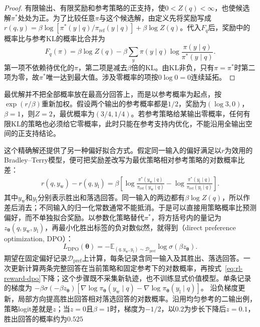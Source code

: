 \begin{proof}
  有限输出、有限奖励和参考策略的正支持，使$0<Z(q)<\infty$，也使候选解$\pi^*$处处为正。为了比较任意$\pi$与这个候选解，由定义先将奖励写成
  $r(q,y)=\beta\log[\pi^*(y\mid q)/\pi_{\mathrm{ref}}(y\mid q)]
  +\beta\log Z(q)$。代入$F_q$后，奖励中的概率比与参考KL的概率比合并为
  \[
    F_q(\pi)=\beta\log Z(q)
       -\beta\sum_y\pi(y\mid q)\log\frac{\pi(y\mid q)}{\pi^*(y\mid q)}.
  \]
  第一项不依赖待优化的$\pi$，第二项是减去$\beta$倍的KL。由KL非负，只有$\pi=\pi^*$时第二项为零，故$\pi^*$唯一达到最大值。涉及零概率的项按$0\log0=0$连续延拓。
\end{proof}

最优解并不把全部概率放在最高分回答上，而是以参考概率为起点，按$\exp(r/\beta)$重新加权。假设两个输出的参考概率都是$1/2$，奖励为$(\log3,0)$，$\beta=1$，则$Z=2$，最优概率为$(3/4,1/4)$。若参考策略给某输出零概率，任何有限KL的策略也必须给它零概率，此时只能在参考支持内优化，不能沿用全输出空间的正支持结论。

这个精确解还提供了另一种偏好拟合方式。假定同一输入的偏好满足以$r$为效用的Bradley--Terry模型，便可把奖励差改写为最优策略相对参考策略的对数概率比差：
\begin{equation}
  \begin{aligned}
    r(q,y_{\mathrm w})-r(q,y_{\mathrm l})
    =\beta\left[
      \log\frac{\pi^*(y_{\mathrm w}\mid q)}
                    {\pi_{\mathrm{ref}}(y_{\mathrm w}\mid q)}
      -\log\frac{\pi^*(y_{\mathrm l}\mid q)}
                    {\pi_{\mathrm{ref}}(y_{\mathrm l}\mid q)}
    \right].
  \end{aligned}
  \label{eq:rl-reward-dpo-change}
\end{equation}
其中$y_{\mathrm w}$和$y_{\mathrm l}$分别表示胜出和落选回答。同一输入的两边都有$\beta\log Z(q)$，所以作差后消去；不同输入的归一化常数通常不能抵消。于是可以直接用策略概率比预测偏好，而不单独拟合奖励。以参数化策略替代$\pi^*$，将方括号内的量记为$z_{\bm{\theta}}(q,y_{\mathrm w},y_{\mathrm l})$，再最小化胜出标签的负对数似然，就得到（direct preference optimization, DPO）：
\begin{equation}
  L_{\mathrm{DPO}}(\bm{\theta})
  =-\mathbb E_{(q,y_{\mathrm w},y_{\mathrm l})\sim\mathcal D_{\mathrm{pref}}}
         \log\sigma\!\left(\beta z_{\bm{\theta}}\right).
  \label{eq:rl-reward-dpo}
\end{equation}
期望在固定偏好记录$\mathcal D_{\mathrm{pref}}$上计算，每条记录含同一输入及其胜出、落选回答。一次更新计算两条完整回答在当前策略和固定参考下的对数概率，再按式~\eqref{eq:rl-reward-dpo}下降；这个步骤既不采集新轨迹，也不训练显式价值模型。单条记录的梯度为
$-\beta\sigma(-\beta z_{\bm{\theta}})
[\nabla\log\pi_{\bm{\theta}}(y_{\mathrm w}\mid q)
-\nabla\log\pi_{\bm{\theta}}(y_{\mathrm l}\mid q)]$。
沿负梯度更新，局部方向提高胜出回答相对落选回答的对数概率。沿用均匀参考的二输出例，策略logit差就是$z$；当$z=0$且$\beta=1$时，梯度为$-1/2$，以$0.2$为步长下降后$z=0.1$，胜出回答的概率约为$0.525$

